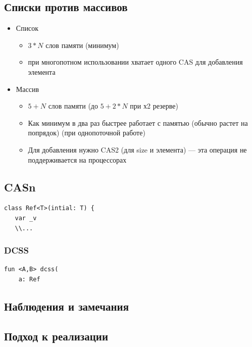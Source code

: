 \documentclass[10pt,a4paper,oneside,titlepage]{article}
\theoremstyle{plain}
\theoremstyle{defenition}
\begin{document}
\subsection{Списки против массивов}
\begin{itemize}
	\item Список
	\begin{itemize}
		\item $3*N$ слов памяти (минимум)
		\item при многопотном использовании хватает одного CAS для добавления элемента
	\end{itemize}
    \item Массив
    \begin{itemize}
    	\item $5+N$ слов памяти (до $5+2*N$ при х2 резерве)
    	\item Как минимум в два раз быстрее работает с памятью (обычно растет на попрядок) (при однопоточной работе)
    	\item Для добавления нужно CAS2 (для size и элемента) --- эта операция не поддерживается на процессорах
    \end{itemize}
\end{itemize}



\subsection{CASn}

\begin{lstlisting}
class Ref<T>(intial: T) {
   var _v
   \\...
\end{lstlisting}

\subsubsection{DCSS}

\begin{lstlisting}
fun <A,B> dcss(
    a: Ref
\end{lstlisting}

\subsection{Наблюдения и замечания}

\subsection{Подход к реализации}
\end{document}
